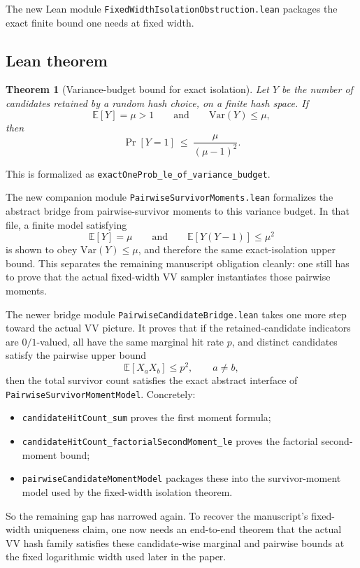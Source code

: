 \documentclass[11pt]{article}
\newtheorem{theorem}{Theorem}[section]
\theoremstyle{remark}
\begin{document}
The new Lean module \texttt{FixedWidthIsolationObstruction.lean} packages the exact finite bound
one needs at fixed width.

\subsection{Lean theorem}

\begin{theorem}[Variance-budget bound for exact isolation]
Let \(Y\) be the number of candidates retained by a random hash choice, on a finite hash space.
If
\[
  \mathbb E[Y]=\mu>1
  \qquad\text{and}\qquad
  \mathrm{Var}(Y)\le \mu,
\]
then
\[
  \Pr[Y=1]\ \le\ \frac{\mu}{(\mu-1)^2}.
\]
\end{theorem}

\noindent
This is formalized as
\texttt{exactOneProb\_le\_of\_variance\_budget}.

The new companion module \texttt{PairwiseSurvivorMoments.lean} formalizes the abstract bridge from
pairwise-survivor moments to this variance budget.  In that file, a finite model satisfying
\[
  \mathbb E[Y]=\mu
  \qquad\text{and}\qquad
  \mathbb E[Y(Y-1)]\le \mu^2
\]
is shown to obey \(\mathrm{Var}(Y)\le \mu\), and therefore the same exact-isolation upper bound.
This separates the remaining manuscript obligation cleanly: one still has to prove that the actual
fixed-width VV sampler instantiates those pairwise moments.

The newer bridge module \texttt{PairwiseCandidateBridge.lean} takes one more step toward the actual
VV picture.  It proves that if the retained-candidate indicators are \(0/1\)-valued, all have the
same marginal hit rate \(p\), and distinct candidates satisfy the pairwise upper bound
\[
  \mathbb E[X_a X_b] \le p^2,
  \qquad a\neq b,
\]
then the total survivor count satisfies the exact abstract interface of
\texttt{PairwiseSurvivorMomentModel}.  Concretely:
\begin{itemize}[leftmargin=1.5em]
  \item \texttt{candidateHitCount\_sum} proves the first moment formula;
  \item \texttt{candidateHitCount\_factorialSecondMoment\_le} proves the factorial second-moment
  bound;
  \item \texttt{pairwiseCandidateMomentModel} packages these into the survivor-moment model used by
  the fixed-width isolation theorem.
\end{itemize}

So the remaining gap has narrowed again.  To recover the manuscript's fixed-width uniqueness claim,
one now needs an end-to-end theorem that the actual VV hash family satisfies these candidate-wise
marginal and pairwise bounds at the fixed logarithmic width used later in the paper.
\end{document}
